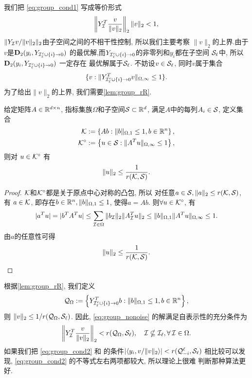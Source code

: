 我们把 \eqref{eq:group_cond1} 写成等价形式
\begin{equation*}
  \left\|Y_{\mathcal{I}}^T \frac{v}{\|v\|_2}\right\|_2 \|v\|_2<1,
\end{equation*}
\(\|Y_{\mathcal{I}} v/\|v\|_2\|_2\)由子空间之间的不相干性控制, 所以我们主要考察
$\|v\|_2$的上界.由于$v$是$\mathbf{D}_2(y_i, Y_{\mathcal{I}_\ell^c\cup \{i\}\rightarrow 0})$
的最优解,而$Y_{\mathcal{I}_\ell^c\cup \{i\}\rightarrow 0}$的非零列和$y_i$都在子空间
$\mathcal{S}_\ell$中, 所以$\mathbf{D}_2(y_i, Y_{\mathcal{I}_\ell^c\cup \{i\}\rightarrow 0})$ 一定存在
最优解属于$\mathcal{S}_\ell$. 不妨设$v\in \mathcal{S}_\ell$, 同时$v$属于集合
$$\{ v: \|Y^T_{\mathcal{I}_\ell^c\cup \{i\}\rightarrow 0} v\|_{\Omega,\infty}\le
1\}.$$
为了给出$\|v\|_2$的上界, 我们需要\autoref{lem:group_rR}. 
\begin{lemma}\label{lem:group_rR}
  给定矩阵$A\in \mathbb{R}^{d\times n}$, 指标集族$\Omega$和子空间$\mathcal{S}\subset \mathbb{R}^d$,
  满足$A$中的每列$A_i\in \mathcal{S}$, 定义集合
  \begin{align*}
    \mathcal{K} &:= \left\{ Ab: \|b\|_{\Omega, 1}\le 1, b\in \mathbb{R}^n \right\},\\
    \mathcal{K}^\circ &:= \left\{ u\in \mathcal{S} : \|A^Tu\|_{\Omega, \infty}\le 1 \right\},
  \end{align*}
  则对 $u\in \mathcal{K}^\circ$ 有
  $$ \|u\|_2 \le \frac{1}{r(\mathcal{K}, \mathcal{S})}.$$
\end{lemma}
\begin{proof}
  $\mathcal{K}$和$\mathcal{K}^\circ$都是关于原点中心对称的凸包, 所以
  对任意$a\in \mathcal{S}, \|a\|_2\le r(\mathcal{K}, \mathcal{S})$, 有 $a \in \mathcal{K}$,
  即存在$ b\in\mathbb{R}^n, \|b\|_{\Omega, 1}\le 1$, 使得$a=Ab$. 则$\forall u\in
  \mathcal{K}^\circ$,
  有
  \begin{equation*}
    |a^T u| = |b^T A^T u| \le \sum_{\mathcal{I}\in \Omega} \|b_{\mathcal{I}}\|_2 \|A^T_{\mathcal{I}} u\|_2
    \le \|b\|_{\Omega, 1}\|A^T u\|_{\Omega,\infty} \le 1.
  \end{equation*}
  由$a$的任意性可得
  $$ \|u\|_2 \le \frac{1}{r(\mathcal{K}, \mathcal{S})}.$$
\end{proof}
根据\autoref{lem:group_rR}, 我们定义
\begin{equation*}
  \mathcal{Q}_\Omega := \left\{ Y^T_{\mathcal{I}_\ell^c\cup \{i\}\rightarrow 0}b:
  \|b\|_{\Omega, 1}\le 1, b\in \mathbb{R}^n \right\},
\end{equation*}
则 $\|v\|_2 \le 1/r(\mathcal{Q}_\Omega, \mathcal{S}_\ell)$.
因此, \eqref{eq:group_nonoise} 的解满足自表示性的充分条件为
\begin{equation} \label{eq:group_cond2}
  \left\|Y_{\mathcal{I}}^T \frac{v}{\|v\|_2}\right\|_2 < r(\mathcal{Q}_\Omega, \mathcal{S}_\ell), \quad
  \mathcal{I} \nsubseteq \mathcal{I}_\ell, \forall\, \mathcal{I} \in \Omega.
\end{equation}
如果我们把 \eqref{eq:group_cond2} 和\cite[定理~2.5]{soltanolkotabi2012geometric}
的条件$|\langle y_i, v/\|v\|_2\rangle|<r(\mathcal{Q}^\ell_{-i}, \mathcal{S}_\ell)$
相比较可以发现, \eqref{eq:group_cond2} 的不等式左右两项都较大, 所以理论上很难
判断那种算法更好.
